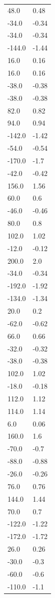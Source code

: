 \begin{longtable}{ll}
48.0 & 0.48 \\
-34.0 & -0.34 \\
-34.0 & -0.34 \\
-144.0 & -1.44 \\
16.0 & 0.16 \\
16.0 & 0.16 \\
-38.0 & -0.38 \\
-38.0 & -0.38 \\
82.0 & 0.82 \\
94.0 & 0.94 \\
-142.0 & -1.42 \\
-54.0 & -0.54 \\
-170.0 & -1.7 \\
-42.0 & -0.42 \\
156.0 & 1.56 \\
60.0 & 0.6 \\
-46.0 & -0.46 \\
80.0 & 0.8 \\
102.0 & 1.02 \\
-12.0 & -0.12 \\
200.0 & 2.0 \\
-34.0 & -0.34 \\
-192.0 & -1.92 \\
-134.0 & -1.34 \\
20.0 & 0.2 \\
-62.0 & -0.62 \\
66.0 & 0.66 \\
-32.0 & -0.32 \\
-38.0 & -0.38 \\
102.0 & 1.02 \\
-18.0 & -0.18 \\
112.0 & 1.12 \\
114.0 & 1.14 \\
6.0 & 0.06 \\
160.0 & 1.6 \\
-70.0 & -0.7 \\
-88.0 & -0.88 \\
-26.0 & -0.26 \\
76.0 & 0.76 \\
144.0 & 1.44 \\
70.0 & 0.7 \\
-122.0 & -1.22 \\
-172.0 & -1.72 \\
26.0 & 0.26 \\
-30.0 & -0.3 \\
-60.0 & -0.6 \\
-110.0 & -1.1 \\

\end{longtable}
